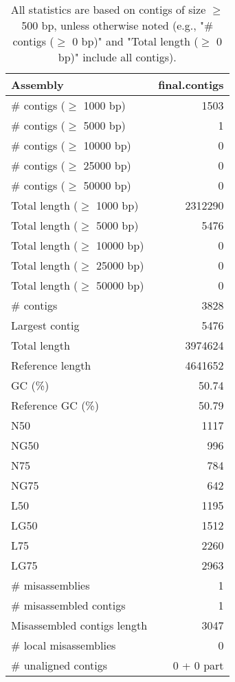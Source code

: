 \documentclass[12pt,a4paper]{article}
\begin{document}
\begin{table}[ht]
\begin{center}
\caption{All statistics are based on contigs of size $\geq$ 500 bp, unless otherwise noted (e.g., "\# contigs ($\geq$ 0 bp)" and "Total length ($\geq$ 0 bp)" include all contigs).}
\begin{tabular}{|l*{1}{|r}|}
\hline
Assembly & final.contigs \\ \hline
\# contigs ($\geq$ 1000 bp) & 1503 \\ \hline
\# contigs ($\geq$ 5000 bp) & 1 \\ \hline
\# contigs ($\geq$ 10000 bp) & 0 \\ \hline
\# contigs ($\geq$ 25000 bp) & 0 \\ \hline
\# contigs ($\geq$ 50000 bp) & 0 \\ \hline
Total length ($\geq$ 1000 bp) & 2312290 \\ \hline
Total length ($\geq$ 5000 bp) & 5476 \\ \hline
Total length ($\geq$ 10000 bp) & 0 \\ \hline
Total length ($\geq$ 25000 bp) & 0 \\ \hline
Total length ($\geq$ 50000 bp) & 0 \\ \hline
\# contigs & 3828 \\ \hline
Largest contig & 5476 \\ \hline
Total length & 3974624 \\ \hline
Reference length & 4641652 \\ \hline
GC (\%) & 50.74 \\ \hline
Reference GC (\%) & 50.79 \\ \hline
N50 & 1117 \\ \hline
NG50 & 996 \\ \hline
N75 & 784 \\ \hline
NG75 & 642 \\ \hline
L50 & 1195 \\ \hline
LG50 & 1512 \\ \hline
L75 & 2260 \\ \hline
LG75 & 2963 \\ \hline
\# misassemblies & 1 \\ \hline
\# misassembled contigs & 1 \\ \hline
Misassembled contigs length & 3047 \\ \hline
\# local misassemblies & 0 \\ \hline
\# unaligned contigs & 0 + 0 part \\ \hline

\end{tabular}
\end{center}
\end{table}
\end{document}
